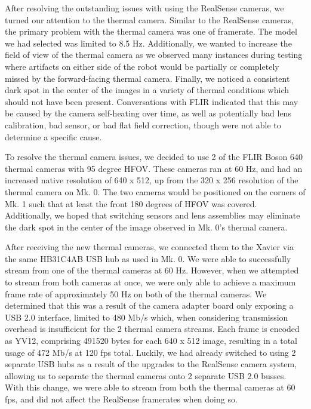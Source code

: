 After resolving the outstanding issues with using the RealSense cameras, we turned our attention to the thermal camera. Similar to the RealSense cameras, the primary problem with the thermal camera was one of framerate. The model we had selected was limited to 8.5 Hz. Additionally, we wanted to increase the field of view of the thermal camera as we observed many instances during testing where artifacts on either side of the robot would be partially or completely missed by the forward-facing thermal camera. Finally, we noticed a consistent dark spot in the center of the images in a variety of thermal conditions which should not have been present. Conversations with FLIR indicated that this may be caused by the camera self-heating over time, as well as potentially bad lens calibration, bad sensor, or bad flat field correction, though were not able to determine a specific cause.

To resolve the thermal camera issues, we decided to use 2 of the FLIR Boson 640 thermal cameras with 95 degree HFOV. These cameras ran at 60 Hz, and had an increased native resolution of 640 x 512, up from the 320 x 256 resolution of the thermal camera on Mk. 0. The two cameras would be positioned on the corners of Mk. 1 such that at least the front 180 degrees of HFOV was covered. Additionally, we hoped that switching sensors and lens assemblies may eliminate the dark spot in the center of the image observed in Mk. 0's thermal camera.

After receiving the new thermal cameras, we connected them to the Xavier via the same HB31C4AB USB hub as used in Mk. 0. We were able to successfully stream from one of the thermal cameras at 60 Hz. However, when we attempted to stream from both cameras at once, we were only able to achieve a maximum frame rate of approximately 50 Hz on both of the thermal cameras. We determined that this was a result of the camera adapter board only exposing a USB 2.0 interface, limited to 480 Mb/s which, when considering transmission overhead is insufficient for the 2 thermal camera streams. Each frame is encoded as YV12, comprising 491520 bytes for each 640 x 512 image, resulting in a total usage of 472 Mb/s at 120 fps total. Luckily, we had already switched to using 2 separate USB hubs as a result of the upgrades to the RealSense camera system, allowing us to separate the thermal cameras onto 2 separate USB 2.0 busses. With this change, we were able to stream from both the thermal cameras at 60 fps, and did not affect the RealSense framerates when doing so.

